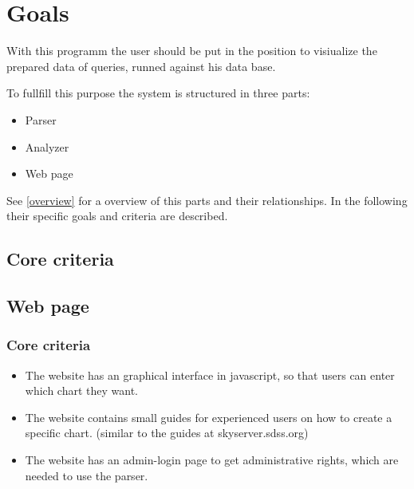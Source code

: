 \section{Goals}


With this programm the user should be put in the position 
to visiualize the prepared data of queries, runned against his data base.


To fullfill this purpose the system is structured in three parts:
\begin{itemize}
  \item Parser
  \item Analyzer
  \item Web page
\end{itemize}
See \ref{overview} for a overview of this parts and their relationships.
In the following their specific goals and criteria are described.


\subsection{Core criteria}




































\subsection{Web page}
\subsubsection{Core criteria}
\begin{itemize}
\item The website has an graphical interface in javascript, so that users can enter which chart they want.

\item The website contains small guides for experienced users on how to create a specific chart. 
(similar to the guides at skyserver.sdss.org)

\item The website has an admin-login page to get administrative rights, which are needed to use the parser.
\end{itemize}

